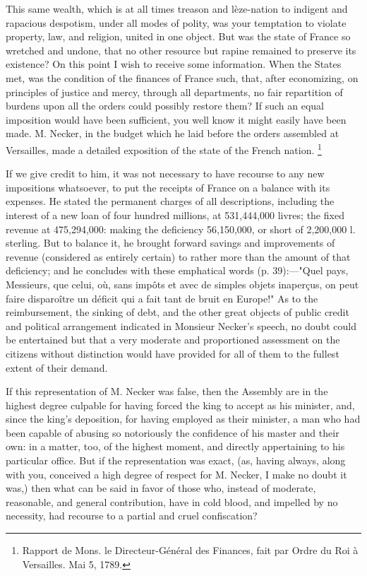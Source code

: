 This same wealth, which is at all times treason and lèze-nation to indigent and rapacious despotism, under all modes of polity, was your temptation to violate property, law, and religion, united in one object. But was the state of France so wretched and undone, that no other resource but rapine remained to preserve its existence? On this point I wish to receive some information. When the States met, was the condition of the finances of France such, that, after economizing, on principles of justice and mercy, through all departments, no fair repartition of burdens upon all the orders could possibly restore them? If such an equal imposition would have been sufficient, you well know it might easily have been made. M. Necker, in the budget which he laid before the orders assembled at Versailles, made a detailed exposition of the state of the French nation.
\footnote{ Rapport de Mons. le Directeur-Général des Finances, fait par Ordre du Roi à Versailles. Mai 5, 1789.}


If we give credit to him, it was not necessary to have recourse to any new impositions whatsoever, to put the receipts of France on a balance with its expenses. He stated the permanent charges of all descriptions, including the interest of a new loan of four hundred millions, at 531,444,000 livres; the fixed revenue at 475,294,000: making the deficiency 56,150,000, or short of 2,200,000 l. sterling. But to balance it, he brought forward savings and improvements of revenue (considered as entirely certain) to rather more than the amount of that deficiency; and he concludes with these emphatical words (p. 39):—"Quel pays, Messieurs, que celui, où, sans impôts et avec de simples objets inaperçus, on peut faire disparoître un déficit qui a fait tant de bruit en Europe!" As to the reimbursement, the sinking of debt, and the other great objects of public credit and political arrangement indicated in Monsieur Necker's speech, no doubt could be entertained but that a very moderate and proportioned assessment on the citizens without distinction would have provided for all of them to the fullest extent of their demand.

If this representation of M. Necker was false, then the Assembly are in the highest degree culpable for having forced the king to accept as his minister, and, since the king's deposition, for having employed as their minister, a man who had been capable of abusing so notoriously the confidence of his master and their own: in a matter, too, of the highest moment, and directly appertaining to his particular office. But if the representation was exact, (as, having always, along with you, conceived a high degree of respect for M. Necker, I make no doubt it was,) then what can be said in favor of those who, instead of moderate, reasonable, and general contribution, have in cold blood, and impelled by no necessity, had recourse to a partial and cruel confiscation?

